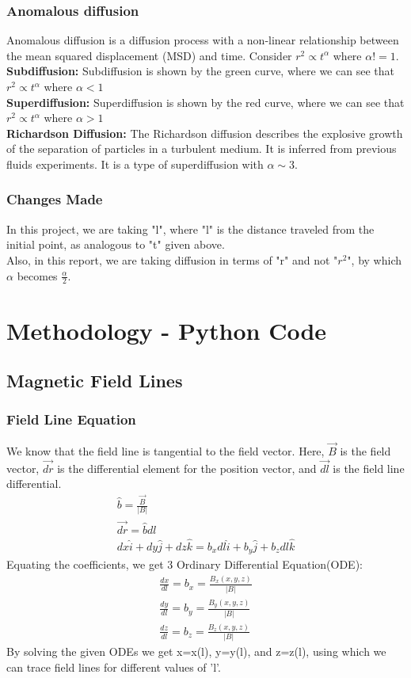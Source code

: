 \documentclass[fleqn]{report}
\providecommand{\abs}[1]{\left\vert#1\right\vert}
\begin{document}
  	\subsection{Anomalous diffusion}
  	 Anomalous diffusion is a diffusion process with a non-linear relationship between the mean squared displacement (MSD) and time. Consider $r^{2} \propto t^ \alpha$ where $\alpha !=1$.\\
  	 \textbf{Subdiffusion:} Subdiffusion is shown by the green curve, where we can see that $r^{2} \propto t^{\alpha}$ where $\alpha < 1$\\
  	 \textbf{Superdiffusion:} Superdiffusion is shown by the red curve, where we can see that $r^{2} \propto t^{\alpha}$ where $\alpha > 1$\\
  	 \textbf{Richardson Diffusion:} The Richardson diffusion describes the explosive growth of the separation of particles in a turbulent medium. It is inferred from previous fluids experiments. It is a type of superdiffusion with $\alpha\sim 3$. 
  	 \subsection{Changes Made}
  	 In this project, we are taking "l", where "l" is the distance traveled from the initial point, as analogous to "t" given above.\\ Also, in this report, we are taking diffusion in terms of "r" and not "$r^{2}$", by which $\alpha$ becomes $\frac{\alpha}{2}$.  
	\chapter{Methodology - Python Code}
	\section{Magnetic Field Lines}
	\subsection{Field Line Equation}
	We know that the field line is tangential to the field vector. Here, $\vec{B}$ is the field vector, $\vec{dr}$ is the differential element for the position vector, and $\vec{dl}$ is the field line differential.
		\begin{align}
		\hat{b}=\frac{\vec{B}}{\abs{B}}\\
		\vec{dr}=\hat{b}dl\\
		dx\hat{i}+dy\hat{j}+dz\hat{k}=b_{x}dl\hat{i}+b_{y}\hat{j}+b_{z}dl\hat{k}
	\end{align}
	Equating the coefficients, we get 3 Ordinary Differential Equation(ODE):
	\begin{align}
		\frac{dx}{dl}=b_{x}=\frac{B_{x}(x,y,z)}{\abs{B}}\\
		\frac{dy}{dl}=b_{y}=\frac{B_{y}(x,y,z)}{\abs{B}}\\
		\frac{dz}{dl}=b_{z}=\frac{B_{z}(x,y,z)}{\abs{B}}
	\end{align} 
	By solving the given ODEs we get x=x(l), y=y(l), and z=z(l), using which we can trace field lines for different values of 'l'. 
\end{document}
